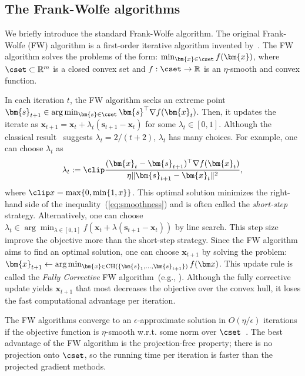 \subsection{The Frank-Wolfe algorithms}
We briefly introduce the standard Frank-Wolfe algorithm. 
The original Frank-Wolfe (FW) algorithm is 
a first-order iterative algorithm 
invented by~\cite{marguerite+:nrl56}. 
The FW algorithm solves the problems of the form:
$\min_{\bm{x} \in \cset} f(\bm{x})$, 
where $\cset \subset \mathbb R^m$ is a closed convex set 
and $f : \cset \to \mathbb R$ is an $\eta$-smooth and convex function. 

In each iteration $t$, 
the FW algorithm seeks an extreme point 
$
    \bm{s}_{t+1}
    \in \arg \min_{\bm{s} \in \cset} \bm{s}^\top \nabla f(\bm{x}_t)
$. 
Then, it updates the iterate as 
$\bm{x}_{t+1} = \bm{x}_t + \lambda_t (\bm{s}_{t+1} - \bm{x}_t)$ 
for some $\lambda_t \in [0, 1]$. 
Although the classical result~\citep{marguerite+:nrl56,jaggi:icml13}
suggests $\lambda_t = 2/(t+2)$, 
$\lambda_t$ has many choices. 
For example, one can choose $\lambda_t$ as
\begin{align}
    \label{eq:short_step_update}
    \lambda_t := 
        \clip
        \frac{(\bm{x}_t - \bm{s}_{t+1})^\top \nabla f(\bm{x}_t)}
             {\eta \|\bm{s}_{t+1} - \bm{x}_t\|^2},
\end{align}
where $\clip x = \max\{0, \min\{1, x\}\}$. 
This optimal solution minimizes 
the right-hand side of the inequality~(\ref{eq:smoothness}) 
and is often called the \emph{short-step} strategy.
Alternatively, one can choose 
$
    \lambda_t \in 
    \arg\min_{\lambda \in [0, 1]} 
    f(\bm{x}_t + \lambda (\bm{s}_{t+1} - \bm{x}_t))
$ by line search. 
This step size improve the objective more than the short-step strategy. 
Since the FW algorithm aims to find an optimal solution, 
one can choose $\bm{x}_{t+1}$ by solving the problem:
$
    \bm{x}_{t+1} \gets
    \arg \min_{
        \bm{x} \in \mathop{\rm CH}(\{\bm{s}_1, \dots, \bm{s}_{t+1}\})
    } f(\bm x)
$. 
This update rule is 
called the \emph{Fully Corrective} FW algorithm~(e.g., \cite{jaggi:icml13}). 
Although the fully corrective update yields $\bm{x}_{t+1}$ 
that most decreases the objective over the convex hull, 
it loses the fast computational advantage per iteration.

The FW algorithms converge to 
an $\epsilon$-approximate solution in $O(\eta/\epsilon)$ iterations 
if the objective function is $\eta$-smooth w.r.t. 
some norm over $\cset$~\citep{jaggi:icml13,marguerite+:nrl56}. 
The best advantage of the FW algorithm is the projection-free property; 
there is no projection onto $\cset$, 
so the running time per iteration is 
faster than the projected gradient methods. 

